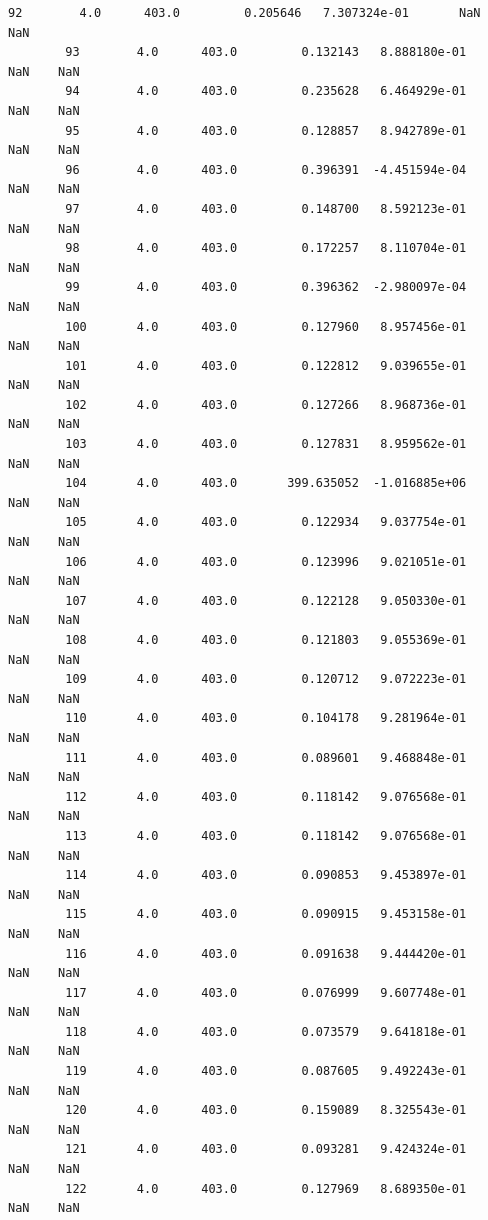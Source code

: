 \documentclass[11pt, a4paper , landscape]{article}
\begin{document}
\begin{Verbatim}[commandchars=\\\{\}]
        92        4.0      403.0         0.205646   7.307324e-01       NaN    NaN  
        93        4.0      403.0         0.132143   8.888180e-01       NaN    NaN  
        94        4.0      403.0         0.235628   6.464929e-01       NaN    NaN  
        95        4.0      403.0         0.128857   8.942789e-01       NaN    NaN  
        96        4.0      403.0         0.396391  -4.451594e-04       NaN    NaN  
        97        4.0      403.0         0.148700   8.592123e-01       NaN    NaN  
        98        4.0      403.0         0.172257   8.110704e-01       NaN    NaN  
        99        4.0      403.0         0.396362  -2.980097e-04       NaN    NaN  
        100       4.0      403.0         0.127960   8.957456e-01       NaN    NaN  
        101       4.0      403.0         0.122812   9.039655e-01       NaN    NaN  
        102       4.0      403.0         0.127266   8.968736e-01       NaN    NaN  
        103       4.0      403.0         0.127831   8.959562e-01       NaN    NaN  
        104       4.0      403.0       399.635052  -1.016885e+06       NaN    NaN  
        105       4.0      403.0         0.122934   9.037754e-01       NaN    NaN  
        106       4.0      403.0         0.123996   9.021051e-01       NaN    NaN  
        107       4.0      403.0         0.122128   9.050330e-01       NaN    NaN  
        108       4.0      403.0         0.121803   9.055369e-01       NaN    NaN  
        109       4.0      403.0         0.120712   9.072223e-01       NaN    NaN  
        110       4.0      403.0         0.104178   9.281964e-01       NaN    NaN  
        111       4.0      403.0         0.089601   9.468848e-01       NaN    NaN  
        112       4.0      403.0         0.118142   9.076568e-01       NaN    NaN  
        113       4.0      403.0         0.118142   9.076568e-01       NaN    NaN  
        114       4.0      403.0         0.090853   9.453897e-01       NaN    NaN  
        115       4.0      403.0         0.090915   9.453158e-01       NaN    NaN  
        116       4.0      403.0         0.091638   9.444420e-01       NaN    NaN  
        117       4.0      403.0         0.076999   9.607748e-01       NaN    NaN  
        118       4.0      403.0         0.073579   9.641818e-01       NaN    NaN  
        119       4.0      403.0         0.087605   9.492243e-01       NaN    NaN  
        120       4.0      403.0         0.159089   8.325543e-01       NaN    NaN  
        121       4.0      403.0         0.093281   9.424324e-01       NaN    NaN  
        122       4.0      403.0         0.127969   8.689350e-01       NaN    NaN  

\end{Verbatim}
\end{document}

